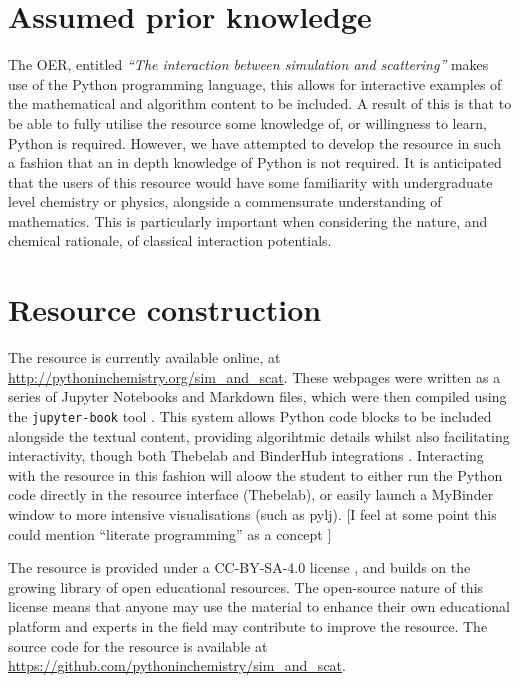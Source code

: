 \documentclass[amsmath,amssymb,twocolumn,superscriptaddress]{revtex4-1}
\begin{document}
\section{Assumed prior knowledge}

The OER, entitled \emph{``The interaction between simulation and scattering''} makes use of the Python programming language, this allows for interactive examples of the mathematical and algorithm content to be included.
A result of this is that to be able to fully utilise the resource some knowledge of, or willingness to learn, Python is required.
However, we have attempted to develop the resource in such a fashion that an in depth knowledge of Python is not required.
It is anticipated that the users of this resource would have some familiarity with undergraduate level chemistry or physics, alongside a commensurate understanding of mathematics.
This is particularly important when considering the nature, and chemical rationale, of classical interaction potentials.

\section{Resource construction}

The resource is currently available online, at \url{http://pythoninchemistry.org/sim_and_scat}.
These webpages were written as a series of Jupyter Notebooks and Markdown files, which were then compiled using the \texttt{jupyter-book} tool \cite{lau_jupyter/jupyter-book_2019}.
This system allows Python code blocks to be included alongside the textual content, providing algorihtmic details whilst also facilitating interactivity, though both Thebelab and BinderHub integrations \cite{ragan-kelley_minrk/thebelab_2019,ragan-kelley_jupyterhub/binderhub_2019,jupyter_binder_2018}.
Interacting with the resource in this fashion will aloow the student to either run the Python code directly in the resource interface (Thebelab), or easily launch a MyBinder window to more intensive visualisations (such as pylj). [I feel at some point this could mention ``literate programming'' as a concept \cite{Knuth_CompJ1984}]

The resource is provided under a CC-BY-SA-4.0 license \cite{noauthor_creative_2019}, and builds on the growing library of open educational resources.
The open-source nature of this license means that anyone may use the material to enhance their own educational platform and experts in the field may contribute to improve the resource.
The source code for the resource is available at \url{https://github.com/pythoninchemistry/sim_and_scat}.
\end{document}
